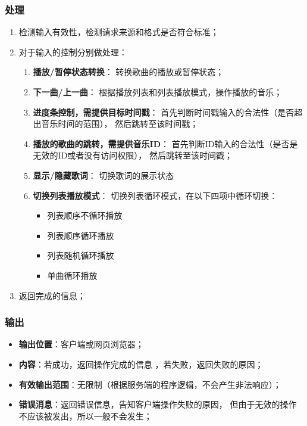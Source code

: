 \subsubsection{处理}
	\begin{enumerate}
		\item 检测输入有效性，检测请求来源和格式是否符合标准；
		\item 对于输入的控制分别做处理：
		\begin{enumerate}
			\item \textbf{播放/暂停状态转换}：
				转换歌曲的播放或暂停状态；
			\item \textbf{下一曲/上一曲}：
				根据播放列表和列表播放模式，操作播放的音乐；
			\item \textbf{进度条控制，需提供目标时间戳}：
				首先判断时间戳输入的合法性（是否超出音乐时间的范围），
				然后跳转至该时间戳；
			\item \textbf{播放的歌曲的跳转，需提供音乐ID}：
				首先判断ID输入的合法性（是否是无效的ID或者没有访问权限），
				然后跳转至该时间戳；
			\item \textbf{显示/隐藏歌词}：
				切换歌词的展示状态
			\item \textbf{切换列表播放模式}：
				切换列表循环模式，在以下四项中循环切换：
					\begin{itemize}
						\item 列表顺序不循环播放
						\item 列表顺序循环播放
						\item 列表随机循环播放
						\item 单曲循环播放
					\end{itemize}
		\end{enumerate}
		\item 返回完成的信息；
	\end{enumerate}
\subsubsection{输出}
\begin{itemize}
	\item \textbf{输出位置}：客户端或网页浏览器；
	\item \textbf{内容}：若成功，返回操作完成的信息 ，若失败，返回失败的原因；
	\item \textbf{有效输出范围}：无限制（根据服务端的程序逻辑，不会产生非法响应）；
	\item \textbf{错误消息}：返回错误信息，告知客户端操作失败的原因，
		但由于无效的操作不应该被发出，所以一般不会发生；
\end{itemize}

